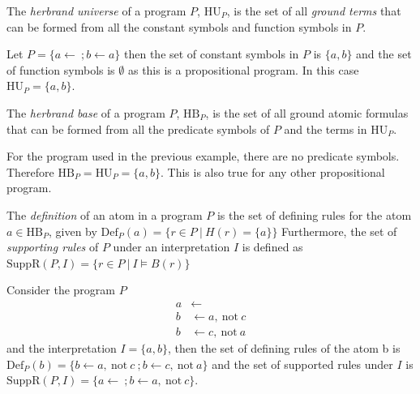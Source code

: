 \begin{definition}
\label{def:herbrand universe}
    The \emph{herbrand universe} of a program $P$, \(\text{HU}_P\), is the set of all \emph{ground terms} that can be formed from all the constant symbols and function symbols in $P$.
\end{definition}

\begin{example}
\label{ex:herbrand universe}
    Let \(P = \{a \leftarrow\ ; b \leftarrow a\}\) then the set of constant symbols in $P$ is \(\{a,b\}\) and the set of function symbols is \(\emptyset\) as this is a propositional program. In this case \(\text{HU}_P = \{a,b\}\).
\end{example}

\begin{definition}
\label{def:herbrand base}
    The \emph{herbrand base} of a program $P$, \(\text{HB}_P\), is the set of all ground atomic formulas that can be formed from all the predicate symbols of $P$ and the terms in \(\text{HU}_P\).
\end{definition}

\begin{example}
\label{ex:herbrand base}
    For the program used in the previous example, there are no predicate symbols. Therefore \(\text{HB}_{P} = \text{HU}_{P} = \{a,b\}\). This is also true for any other propositional program. 
\end{example}

The \emph{definition} of an atom in a program $P$ is the set of defining rules for the atom \(a \in \text{HB}_P\), given by
\(
    \text{Def}_P(a) = \{r \in P \ | \ H(r) = \{a\}\}
\)
Furthermore, the set of \emph{supporting rules} of $P$ under an interpretation $I$ is defined as
\(
    \text{SuppR}(P, I) = \{r \in P \ | \ I \models B(r)\}
\)
\begin{example}
\label{ex:def/supp}
    Consider the program $P$
    \begin{align*}
        a &\leftarrow \\
        b &\leftarrow a,\ \text{not}\ c \\
        b &\leftarrow c,\ \text{not}\ a
    \end{align*}
    and the interpretation \(I = \{a, b\}\), then the set of defining rules of the atom b is \(\text{Def}_P(b) = \{b \leftarrow a,\ \text{not}\ c\ ; b \leftarrow c,\ \text{not}\ a\}\) and the set of supported rules under $I$ is \(\text{SuppR}(P, I) = \{a \leftarrow\ ; b \leftarrow a,\ \text{not}\ c\}\).
\end{example}

